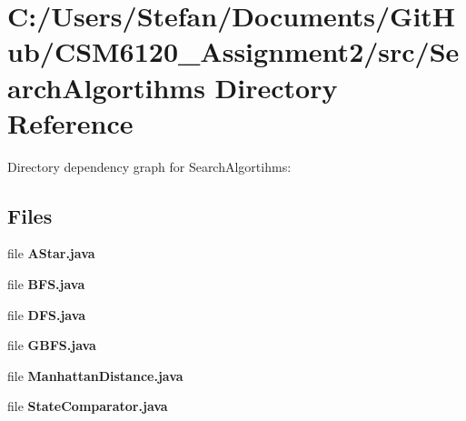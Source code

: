 \section{C\+:/\+Users/\+Stefan/\+Documents/\+Git\+Hub/\+C\+S\+M6120\+\_\+\+Assignment2/src/\+Search\+Algortihms Directory Reference}
\label{dir_6b5681e7e189b03c27f2fe8a42425c22}
Directory dependency graph for Search\+Algortihms\+:
\subsection*{Files}
\begin{DoxyCompactItemize}
\item 
file {\bfseries A\+Star.\+java}
\item 
file {\bfseries B\+F\+S.\+java}
\item 
file {\bfseries D\+F\+S.\+java}
\item 
file {\bfseries G\+B\+F\+S.\+java}
\item 
file {\bfseries Manhattan\+Distance.\+java}
\item 
file {\bfseries State\+Comparator.\+java}
\end{DoxyCompactItemize}
